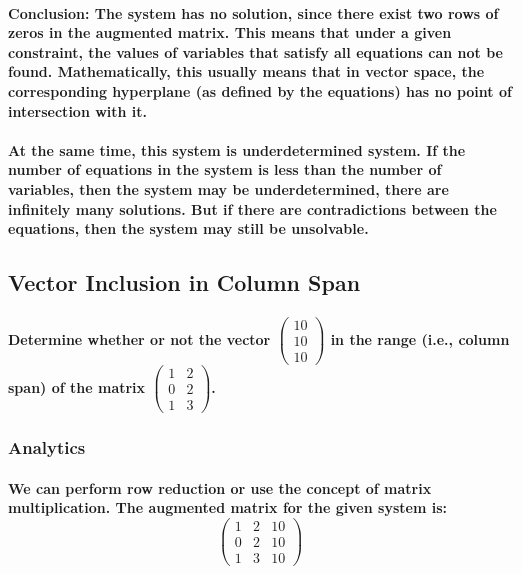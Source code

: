 \paragraph{\textbf{Conclusion:} The system has no solution, since there exist two rows of zeros in the augmented matrix. This means that under a given constraint, the values of variables that satisfy all equations can not be found. Mathematically, this usually means that in vector space, the corresponding hyperplane (as defined by the equations) has no point of intersection with it.}
\paragraph{At the same time, this system is underdetermined system. If the number of equations in the system is less than the number of variables, then the system may be underdetermined, there are infinitely many solutions. But if there are contradictions between the equations, then the system may still be unsolvable.}
% 
% 
% 
% 
% 
% 
% 
\subsection{Vector Inclusion in Column Span}
\paragraph{Determine whether or not the vector
    $
        \begin{pmatrix}
            10 \\
            10 \\
            10
        \end{pmatrix}
    $
    in the range (i.e., column span) of the matrix
    $
        \begin{pmatrix}
            1 & 2 \\
            0 & 2 \\
            1 & 3
        \end{pmatrix}
    $.}

% 
% 
% 
% 
% 
\subsubsection{Analytics}
\paragraph{We can perform row reduction or use the concept of matrix multiplication. The augmented matrix for the given system is:
    \[ \left(\begin{array}{cc|c}
            1 & 2 & 10 \\
            0 & 2 & 10 \\
            1 & 3 & 10
        \end{array}\right) \]
}
% 
% 
% 
% 
% 

